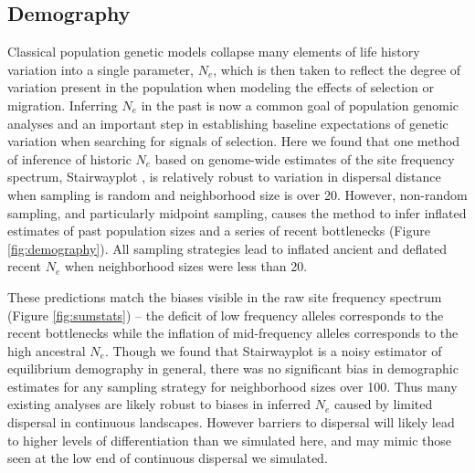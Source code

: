 \documentclass[11pt,twoside,lineno]{preprint}
\newif\ifcomments
\newcommand{\cjb}[1]{\ifcomments{{\color{orange} \it (#1)}}\else{}\fi}
\newcommand{\ak}[1]{\ifcomments{{\color{red} \it (#1)}}\else{}\fi}
\begin{document}
\subsection{Demography}
Classical population genetic models collapse many elements of life history variation into a single parameter, $N_{e}$, which is then taken to reflect the degree of variation present in the population when modeling the effects of selection or migration. Inferring $N_{e}$ in the past is now a common goal of population genomic analyses and an important step in establishing baseline expectations of genetic variation when searching for signals of selection. Here we found that one method of inference of historic $N_{e}$ based on genome-wide estimates of the site frequency spectrum, Stairwayplot \citep{Liu2015}, is relatively robust to variation in dispersal distance when sampling is random and neighborhood size is over 20. However, non-random sampling, and particularly midpoint sampling, causes the method to infer inflated estimates of past population sizes and a series of recent bottlenecks (Figure \ref{fig:demography}). All sampling strategies lead to inflated ancient and deflated recent $N_{e}$ when neighborhood sizes were less than 20.

These predictions match the biases visible in the raw site frequency spectrum (Figure \ref{fig:sumstats}) -- the deficit of low frequency alleles corresponds to the recent bottlenecks while the inflation of mid-frequency alleles corresponds to the high ancestral $N_{e}$. Though we found that Stairwayplot is a noisy estimator of equilibrium demography in general, there was no significant bias in demographic estimates for any sampling strategy for neighborhood sizes over 100. Thus many existing analyses are likely robust to biases in inferred $N_{e}$ caused by limited dispersal in continuous landscapes. However  barriers to dispersal will likely lead to higher levels of differentiation than we simulated here, and may mimic those seen at the low end of continuous dispersal we simulated.  

\cjb{could be another paragraph here discussing the relationship between Ne, the distribution of coalescence times, and dispersal.}
\ak{wonder if it is worth revisting MSMC or similar now that we know more about how to run the method?}
\end{document}
